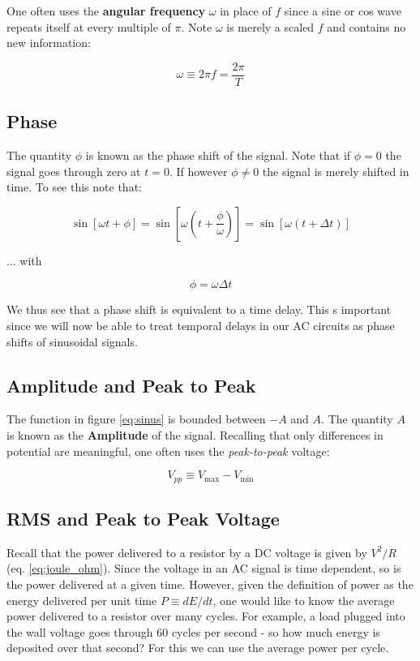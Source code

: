 \documentclass{tufte-book}
\begin{document}
One often uses the \textbf{angular frequency} $\omega$ in place of $f$ since a sine or cos wave repeats itself at every multiple of $\pi$. Note $\omega$ is merely a scaled $f$ and contains no new information:

\begin{equation}\label{def:angfreq}
\omega \equiv 2\pi f = \frac{2\pi}{T}
\end{equation}

\subsection{Phase}
The quantity $\phi$ is known as the phase shift of the signal. Note that if $\phi=0$ the signal goes through zero at $t=0$. If however $\phi\ne0$ the signal is merely shifted in time. To see this note that:

\begin{equation}\label{eq:phase_shift}
\sin\left[\omega t + \phi\right] = \sin\left[\omega\left(t  + \frac{\phi}{\omega}\right)\right] = \sin\left[\omega\left(t  + \Delta t\right)\right]
\end{equation}

\noindent ... with 

\begin{equation}\label{eq:phase_shift2}
\phi = \omega\Delta t
\end{equation}

We thus see that a phase shift is equivalent to a time delay. This s important since we will now be able to treat temporal delays in our AC circuits as phase shifts of sinusoidal signals.

\subsection{Amplitude and Peak to Peak}
The function in figure \ref{eq:sinus} is bounded between $-A$ and $A$. The quantity $A$ is known as the \textbf{Amplitude} of the signal. Recalling that only differences in potential are meaningful, one often uses the \textit{peak-to-peak} voltage:

\begin{equation}\label{def:Vpp}
V_{pp}\equiv V_\text{max} - V_\text{min}
\end{equation}

\subsection{RMS and Peak to Peak Voltage}
Recall that the power delivered to a resistor by a DC voltage is given by $V^2/R$ (eq. \ref{eq:joule_ohm}). Since the voltage in an AC signal is time dependent, so is the power delivered at a given time. However, given the definition of power as the energy delivered per unit time $P\equiv dE/dt$, one would like to know the average power delivered to a resistor over many cycles. For example, a load plugged into the wall voltage goes through 60 cycles per second - so how much energy is deposited over that second? For this we can use the average power per cycle. 
\end{document}
